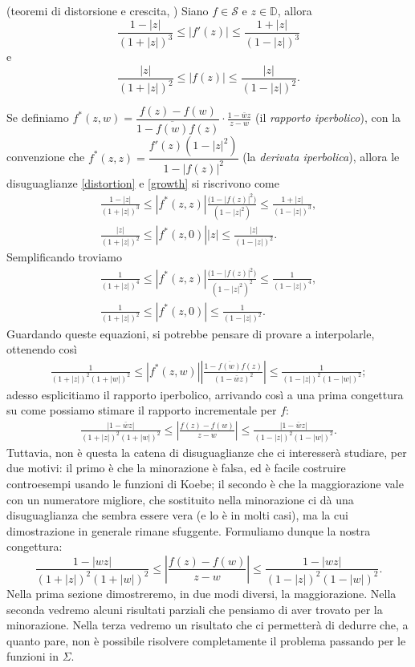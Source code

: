 \begin{thm}
  (teoremi di distorsione e crescita, \cite[Chapter 2.3, Theorems 2.5 and 2.6]{D}) Siano $f \in \mathcal{S}$ e $z \in \mathbb{D}$, allora
  \begin{equation}\label{distortion}
    \frac{1-|z|}{(1+|z|)^3} \le |f'(z)| \le \frac{1+|z|}{(1-|z|)^3}
  \end{equation}
  e
  \begin{equation}\label{growth}
    \frac{|z|}{(1+|z|)^2} \le |f(z)| \le \frac{|z|}{(1-|z|)^2}.
  \end{equation}
\end{thm}
Se definiamo $f^*(z,w)=\dfrac{f(z)-f(w)}{1-\overline{f(w)}f(z)}\cdot\frac{1-\bar{w}z}{z-w}$ (il \textit{rapporto iperbolico}), con la convenzione che $f^*(z,z)=\dfrac{f'(z)(1-|z|^2)}{1-|f(z)|^2}$ (la \textit{derivata iperbolica}), allora le disuguaglianze \eqref{distortion} e \eqref{growth} si riscrivono come
\begin{gather*}
  \frac{1-|z|}{(1+|z|)^3} \le |f^*(z,z)|\frac{\big(1-|f(z)|^2\big)}{(1-|z|^2)} \le \frac{1+|z|}{(1-|z|)^3}, \\
  \frac{|z|}{(1+|z|)^2} \le |f^*(z,0)||z| \le \frac{|z|}{(1-|z|)^2}.
\end{gather*}
Semplificando troviamo
\begin{gather*}
  \frac{1}{(1+|z|)^4} \le |f^*(z,z)|\frac{\big(1-|f(z)|^2\big)}{(1-|z|^2)^2} \le \frac{1}{(1-|z|)^4}, \\
  \frac{1}{(1+|z|)^2} \le |f^*(z,0)| \le \frac{1}{(1-|z|)^2}.
\end{gather*}
Guardando queste equazioni, si potrebbe pensare di provare a interpolarle, ottenendo così
\begin{gather*}
  \frac{1}{(1+|z|)^2(1+|w|)^2} \le |f^*(z,w)| \left|\frac{1-\overline{f(w)}f(z)}{(1-\bar{w}z)^2}\right| \le \frac{1}{(1-|z|)^2(1-|w|)^2};
\end{gather*}
adesso esplicitiamo il rapporto iperbolico, arrivando così a una prima congettura su come possiamo stimare il rapporto incrementale per $f$:
\begin{gather*}
  \frac{|1-\bar{w}z|}{(1+|z|)^2(1+|w|)^2} \le \left|\frac{f(z)-f(w)}{z-w}\right| \le \frac{|1-\bar{w}z|}{(1-|z|)^2(1-|w|)^2}.
\end{gather*}
Tuttavia, non è questa la catena di disuguaglianze che ci interesserà studiare, per due motivi: il primo è che la minorazione è falsa, ed è facile costruire controesempi usando le funzioni di Koebe; il secondo è che la maggiorazione vale con un numeratore migliore, che sostituito nella minorazione ci dà una disuguaglianza che sembra essere vera (e lo è in molti casi), ma la cui dimostrazione in generale rimane sfuggente. Formuliamo dunque la nostra congettura:
\begin{equation}\label{congettura}
  \frac{1-|wz|}{(1+|z|)^2(1+|w|)^2} \le \left|\frac{f(z)-f(w)}{z-w}\right| \le \frac{1-|wz|}{(1-|z|)^2(1-|w|)^2}.
\end{equation}
Nella prima sezione dimostreremo, in due modi diversi, la maggiorazione. Nella seconda vedremo alcuni risultati parziali che pensiamo di aver trovato per la minorazione. Nella terza vedremo un risultato che ci permetterà di dedurre che, a quanto pare, non è possibile risolvere completamente il problema passando per le funzioni in $\Sigma$.
